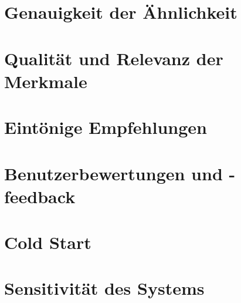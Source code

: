 



\section{Genauigkeit der Ähnlichkeit}

\section{Qualität und Relevanz der Merkmale}

\section{Eintönige Empfehlungen}

\section{Benutzerbewertungen und -feedback}

\section{Cold Start}

\section{Sensitivität des Systems}
\newpage